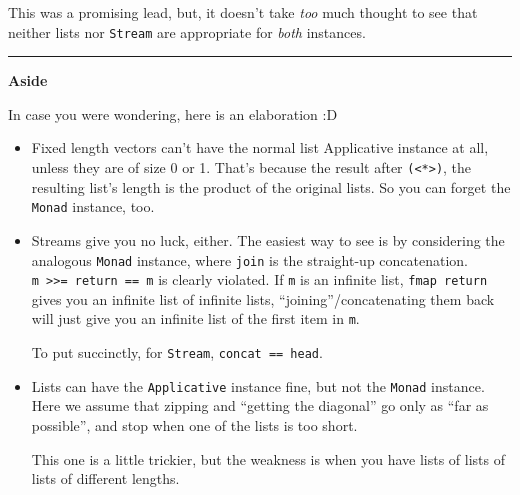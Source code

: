 \documentclass[]{article}
\newenvironment{Shaded}{}{}
\newcommand{\DecValTok}[1]{\textcolor[rgb]{0.25,0.63,0.44}{#1}}
\newcommand{\FunctionTok}[1]{\textcolor[rgb]{0.02,0.16,0.49}{#1}}
\newcommand{\KeywordTok}[1]{\textcolor[rgb]{0.00,0.44,0.13}{\textbf{#1}}}
\newcommand{\NormalTok}[1]{#1}
\newcommand{\OperatorTok}[1]{\textcolor[rgb]{0.40,0.40,0.40}{#1}}
\newcommand{\OtherTok}[1]{\textcolor[rgb]{0.00,0.44,0.13}{#1}}
\begin{document}
This was a promising lead, but, it doesn't take \emph{too} much thought to see
that neither lists nor \texttt{Stream} are appropriate for \emph{both}
instances.

\begin{center}\rule{0.5\linewidth}{0.5pt}\end{center}

\textbf{Aside}

In case you were wondering, here is an elaboration :D

\begin{itemize}
\item
  Fixed length vectors can't have the normal list Applicative instance at all,
  unless they are of size 0 or 1. That's because the result after
  \texttt{(\textless{}*\textgreater{})}, the resulting list's length is the
  product of the original lists. So you can forget the \texttt{Monad} instance,
  too.
\item
  Streams give you no luck, either. The easiest way to see is by considering the
  analogous \texttt{Monad} instance, where \texttt{join} is the straight-up
  concatenation. \texttt{m\ \textgreater{}\textgreater{}=\ return\ ==\ m} is
  clearly violated. If \texttt{m} is an infinite list, \texttt{fmap\ return}
  gives you an infinite list of infinite lists, ``joining''/concatenating them
  back will just give you an infinite list of the first item in \texttt{m}.

  To put succinctly, for \texttt{Stream}, \texttt{concat\ ==\ head}.
\item
  Lists can have the \texttt{Applicative} instance fine, but not the
  \texttt{Monad} instance. Here we assume that zipping and ``getting the
  diagonal'' go only as ``far as possible'', and stop when one of the lists is
  too short.

  This one is a little trickier, but the weakness is when you have lists of
  lists of lists of different lengths.

\begin{Shaded}
\end{Shaded}


\end{itemize}
\end{document}
